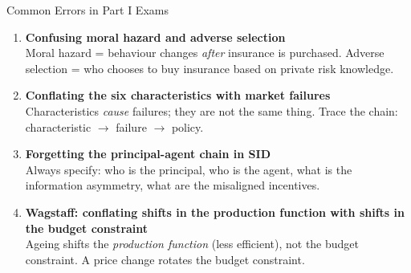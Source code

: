 \documentclass[aspectratio=169, 12pt]{beamer}
\begin{document}
\begin{frame}{Common Errors in Part I Exams}
  \begin{enumerate}
    \item \textbf{Confusing moral hazard and adverse selection}\\
          {\small Moral hazard = behaviour changes \emph{after} insurance is purchased.
          Adverse selection = who chooses to buy insurance based on private risk knowledge.}
    \vspace{0.2em}
    \item \textbf{Conflating the six characteristics with market failures}\\
          {\small Characteristics \emph{cause} failures; they are not the same thing.
          Trace the chain: characteristic $\rightarrow$ failure $\rightarrow$ policy.}
    \vspace{0.2em}
    \item \textbf{Forgetting the principal-agent chain in SID}\\
          {\small Always specify: who is the principal, who is the agent, what is the
          information asymmetry, what are the misaligned incentives.}
    \vspace{0.2em}
    \item \textbf{Wagstaff: conflating shifts in the production function with shifts in the
          budget constraint}\\
          {\small Ageing shifts the \emph{production function} (less efficient), not the
          budget constraint. A price change rotates the budget constraint.}
  \end{enumerate}
\end{frame}
\end{document}

